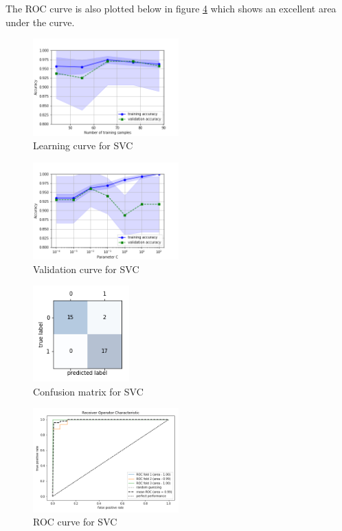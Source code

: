 \documentclass[acmtog]{acmart}
\begin{document}
The ROC curve is also plotted below in figure \ref{fig:ROC_curve} which shows an excellent area under the curve.

\begin{figure}[h]
  \includegraphics[width=0.5\textwidth]{learning_curve}
  \caption{Learning curve for SVC}
  \label{fig:learning_curve}
\end{figure}

\begin{figure}[h]
  \includegraphics[width=0.5\textwidth]{validation_curve}
  \caption{Validation curve for SVC}
  \label{fig:validation_curve}
\end{figure}

\begin{figure}[h]
  \includegraphics[width=0.33\textwidth]{confusion_matrix}
  \caption{Confusion matrix for SVC}
  \label{fig:confusion_matrix}
\end{figure}

\begin{figure}[h]
  \includegraphics[width=0.5\textwidth]{ROC_curve}
  \caption{ROC curve for SVC}
  \label{fig:ROC_curve}
\end{figure}
\end{document}
